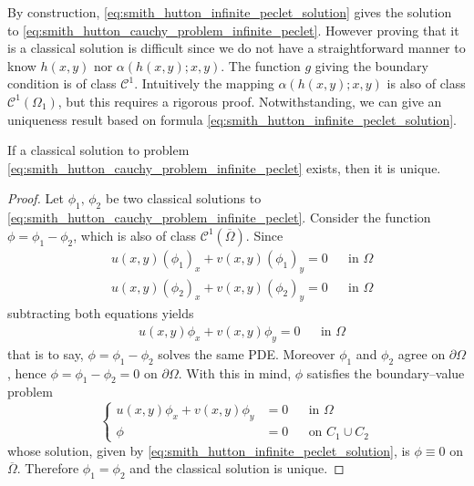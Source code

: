 By construction, \eqref{eq:smith_hutton_infinite_peclet_solution} gives the
solution to \eqref{eq:smith_hutton_cauchy_problem_infinite_peclet}. However
proving that it is a classical solution is difficult since we do not have a
straightforward manner to know $h(x,y)$ nor $\alpha(h(x,y);x,y)$. The function
$g$ giving the boundary condition is of class $\mathcal{C}^1$. Intuitively the
mapping $\alpha(h(x,y);x,y)$ is also of class $\mathcal{C}^1(\Omega_1)$, but this
requires a rigorous proof. Notwithstanding, we can give an uniqueness result
based on formula \eqref{eq:smith_hutton_infinite_peclet_solution}.

\begin{theorem}
	If a classical solution to problem
	\eqref{eq:smith_hutton_cauchy_problem_infinite_peclet} exists, then it is unique.
\end{theorem}
\begin{proof}
	Let $\phi_1, \, \phi_2$ be two classical solutions to
	\eqref{eq:smith_hutton_cauchy_problem_infinite_peclet}. Consider the
	function $\phi = \phi_1 - \phi_2$, which is also of class
	$\mathcal{C}^1(\overline{\Omega})$. Since
	\begin{equation*}
		\begin{aligned}
			&u(x,y) (\phi_1)_x + v(x,y) (\phi_1)_y = 0 & &\text{in } \Omega \\
			&u(x,y) (\phi_2)_x + v(x,y) (\phi_2)_y = 0 & &\text{in } \Omega
		\end{aligned}
	\end{equation*}
	subtracting both equations yields 
	\begin{equation*}
		\begin{aligned}
			&u(x,y) \phi_x + v(x,y) \phi_y = 0 & &\text{in } \Omega
		\end{aligned}
	\end{equation*}
	that is to say, $\phi = \phi_1 - \phi_2$ solves the same PDE. Moreover
	$\phi_1$ and $\phi_2$ agree on $\partial \Omega$, hence $\phi = \phi_1 -
	\phi_2 = 0$ on $\partial \Omega$. With this in mind, $\phi$ satisfies the
	boundary--value problem 
	\begin{equation*}
		\left\{
		\begin{aligned}
			u(x,y) \phi_x + v(x,y) \phi_y &= 0 	& &\text{in } \Omega \\
			\phi &= 0 							& &\text{on } C_1 \cup C_2
		\end{aligned}
		\right.
	\end{equation*}
	whose solution, given by \eqref{eq:smith_hutton_infinite_peclet_solution},
	is $\phi \equiv 0$ on $\overline{\Omega}$. Therefore $\phi_1 = \phi_2$ and
	the classical solution is unique.
\end{proof}

